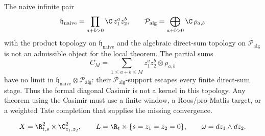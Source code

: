 \begin{ex}\label{exa:unweighted-diagonal-nonadmissible}
  The naive infinite pair
  \[
    \mathfrak h_{\mathrm{naive}}=\prod_{a+b>0}\C\,z_1^az_2^b,\qquad
    \mathcal P_{\mathrm{alg}}=\bigoplus_{a+b>0}\C\,\rho_{a,b}
  \]
  with the product topology on \(\mathfrak h_{\mathrm{naive}}\) and the
  algebraic direct-sum topology on \(\mathcal P_{\mathrm{alg}}\) is not
  an admissible object for the local theorem.  The partial sums
  \[
    C_M=\sum_{1\leq a+b\leq M}z_1^az_2^b\otimes\rho_{a,b}
  \]
  have no limit in
  \(\mathfrak h_{\mathrm{naive}}\widehat\otimes\mathcal P_{\mathrm{alg}}\):
  their \(\mathcal P_{\mathrm{alg}}\)-support escapes every finite
  direct-sum stage.  Thus the formal diagonal Casimir is not a kernel in
  this topology.  Any theorem using the Casimir must use a finite window,
  a Roos/pro-Matlis target, or a weighted Tate completion that supplies
  the missing convergence.
\end{ex}

\begingroup
\small
\setlength{\parindent}{0pt}
\setlength{\tabcolsep}{3pt}
\renewcommand{\arraystretch}{1.15}

\[
  X=\R^2_{t,s}\times\C^2_{z_1,z_2},\qquad
  L=\R_t\times\{s=z_1=z_2=0\},\qquad
  \omega=dz_1\wedge dz_2.
\]

